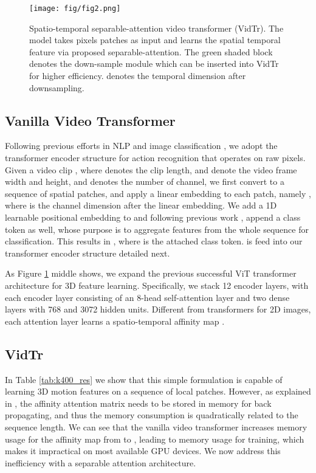 \documentclass[10pt,twocolumn,letterpaper]{article}
\begin{document}
\begin{figure}[t]
	\begin{center}
		\texttt{[image: fig/fig2.png]}
	\end{center}
	\caption{
		Spatio-temporal separable-attention video transformer (VidTr). The model takes pixels patches as input and learns the spatial temporal feature via proposed separable-attention. The green shaded block denotes the down-sample module which can be inserted into VidTr for higher efficiency.  denotes the  temporal dimension after downsampling.
	}
	\label{fig:2}
\end{figure}

\subsection{Vanilla Video Transformer}
\label{sec:v_vidtr}
Following previous efforts in NLP \cite{devlin2019bert} and image classification \cite{dosovitskiy2020image}, we adopt the transformer \cite{vaswani2017attention} encoder structure for action recognition that operates on raw pixels. 
Given a video clip , where  denotes the clip length,  and  denote the video frame width and height, and  denotes the number of channel, we first convert  to a sequence of  spatial patches, and apply a linear embedding to each patch, namely , where  is the channel dimension after the linear embedding.
We add a 1D learnable positional embedding \cite{devlin2019bert, dosovitskiy2020image} to  and following previous work \cite{devlin2019bert, dosovitskiy2020image}, append a class token as well, whose purpose is to aggregate features from the whole sequence for classification. This results in , where  is the attached class token.  is feed into our transformer encoder structure detailed next.

As Figure \ref{fig:2} middle shows, we expand the previous successful ViT transformer architecture for 3D feature learning. Specifically, we stack 12 encoder layers, with each encoder layer consisting of an 8-head self-attention layer and two dense layers with 768 and 3072 hidden units. Different from transformers for 2D images, each attention layer learns a spatio-temporal affinity map . 

\subsection{VidTr}
\label{sec:s_vidtr}
In Table \ref{tab:k400_res} we show that this simple formulation is capable of learning 3D motion features on a sequence of local patches. However, as explained in \cite{beltagy2020longformer}, the affinity attention matrix  needs to be stored in memory for back propagating, and thus the memory consumption is quadratically related to the sequence length. We can see that the vanilla video transformer increases memory usage for the affinity map from  to , leading to  memory usage for training, which makes it impractical on most available GPU devices. We now address this inefficiency with a separable attention architecture.
\end{document}
